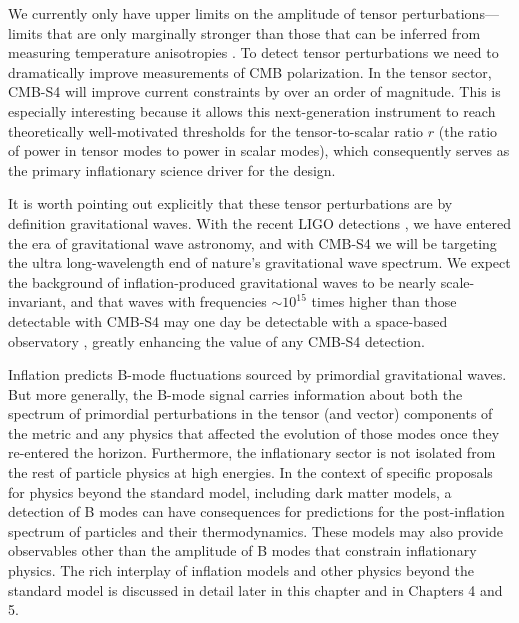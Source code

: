 We currently only have upper limits on the amplitude of tensor perturbations---limits that are only marginally stronger than those that can be inferred from measuring temperature anisotropies \cite{Ade:2015lrj,Array:2015xqh}. To detect tensor perturbations we need to dramatically improve measurements of CMB polarization. %
In the tensor sector, CMB-S4 will improve current constraints by over an order of magnitude. This is especially interesting because it allows this next-generation instrument to reach theoretically well-motivated thresholds for the tensor-to-scalar ratio $r$ (the ratio of power in tensor modes to power in scalar modes), which consequently serves as the primary inflationary science driver for the design. 

It is worth pointing out explicitly that these tensor perturbations are by definition gravitational waves. With the recent LIGO detections \cite{Abbott:2016blz,Abbott:2016nmj}, we have entered the era of gravitational wave astronomy, and with CMB-S4 we will be targeting the ultra long-wavelength end of nature's gravitational wave spectrum. We expect the background of inflation-produced gravitational waves to be nearly scale-invariant, and that waves with frequencies $\sim 10^{15}$ times higher than those detectable with CMB-S4 may one day be detectable with a space-based observatory \cite{Caligiuri:2014sla}, greatly enhancing the value of any CMB-S4 detection. 

Inflation predicts B-mode fluctuations sourced by primordial gravitational waves. But more generally, the B-mode signal carries information about both the spectrum of primordial perturbations in the tensor (and vector) components of the metric and any physics that affected the evolution of those modes once they re-entered the horizon. Furthermore, the inflationary sector is not isolated from the rest of particle physics at high energies. In the context of specific proposals for physics beyond the standard model, including dark matter models, a detection of B modes can have consequences for predictions for the post-inflation spectrum of particles and their thermodynamics. These models may also provide observables other than the amplitude of B modes that constrain inflationary physics. The rich interplay of inflation models and other physics beyond the standard model is discussed in detail later in this chapter and in Chapters 4 and 5.

